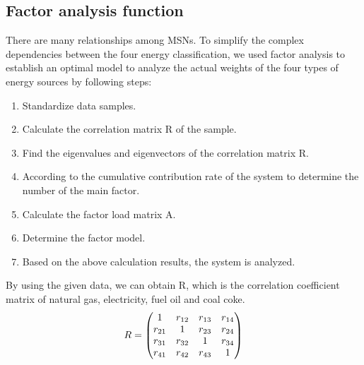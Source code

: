 \documentclass[a4paper,11pt]{article}
\begin{document}
\subsection{Factor analysis function}

\par There are many relationships among MSNs. To simplify the complex dependencies between the four energy classification, we used factor analysis to establish an optimal model to analyze the actual weights of the four types of energy sources by following steps\cite{2}:

\begin{enumerate}[Step 1:]
\item Standardize data samples.

\item Calculate the correlation matrix R of the sample.

\item Find the eigenvalues and eigenvectors of the correlation matrix R.

\item According to the cumulative contribution rate of the system to determine the number of the main factor.

\item Calculate the factor load matrix A.

\item Determine the factor model.

\item Based on the above calculation results, the system is analyzed.
\end{enumerate}

\par By using the given data, we can obtain R, which is the correlation coefficient matrix of natural gas, electricity, fuel oil and coal coke.
\begin{equation}
    \centering
R=\begin{pmatrix} 1 & r_{12} & r_{13} & r_{14} \\ r_{21} & 1 & r_{23} & r_{24} \\ r_{31} & r_{32} & 1 & r_{34} \\ r_{41} & r_{42} & r_{43} & 1\end{pmatrix}
\end{equation}
\end{document}
